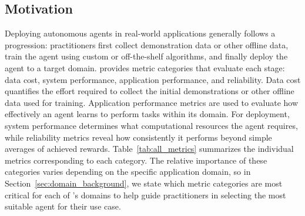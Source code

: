 





\subsection{Motivation}
\label{ssec:metrics_motivation}
Deploying autonomous agents in real-world applications generally follows a progression: practitioners first collect demonstration data or other offline data, train the agent using custom or off-the-shelf algorithms, and finally deploy the agent to a target domain.
\method provides metric categories that evaluate each stage: data cost, system performance, application performance, and reliability. 
Data cost quantifies the effort required to collect the initial demonstrations or other offline data used for training.
Application performance metrics are used to evaluate how effectively an agent learns to perform tasks within its domain.
For deployment, system performance determines what computational resources the agent requires, while reliability metrics reveal how consistently it performs beyond simple averages of achieved rewards.
Table~\ref{tab:all_metrics} summarizes the individual metrics corresponding to each category.
The relative importance of these categories varies depending on the specific application domain, so in Section~\ref{sec:domain_background}, we state which metric categories are most critical for each of \method's domains to help guide practitioners in selecting the most suitable agent for their use case.

